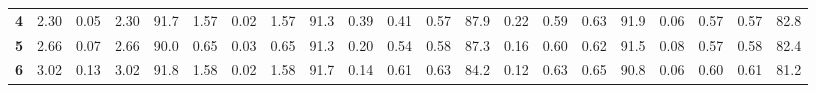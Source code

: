 \begin{tabular}{l|rrrr|rrrr|rrrr|rrrr|rrrr}
	\textbf{4  } &                     2.30 &                  0.05 &          2.30 &                  91.7 &                     1.57 &                  0.02 &          1.57 &                  91.3 &                     0.39 &                  0.41 &          0.57 &                  87.9 &                     0.22 &                  0.59 &          0.63 &                  91.9 &                     0.06 &                  0.57 &          0.57 &                  82.8 \\
	\textbf{5  } &                     2.66 &                  0.07 &          2.66 &                  90.0 &                     0.65 &                  0.03 &          0.65 &                  91.3 &                     0.20 &                  0.54 &          0.58 &                  87.3 &                     0.16 &                  0.60 &          0.62 &                  91.5 &                     0.08 &                  0.57 &          0.58 &                  82.4 \\
	\textbf{6  } &                     3.02 &                  0.13 &          3.02 &                  91.8 &                     1.58 &                  0.02 &          1.58 &                  91.7 &                     0.14 &                  0.61 &          0.63 &                  84.2 &                     0.12 &                  0.63 &          0.65 &                  90.8 &                     0.06 &                  0.60 &          0.61 &                  81.2 \\
	\bottomrule
\end{tabular}

